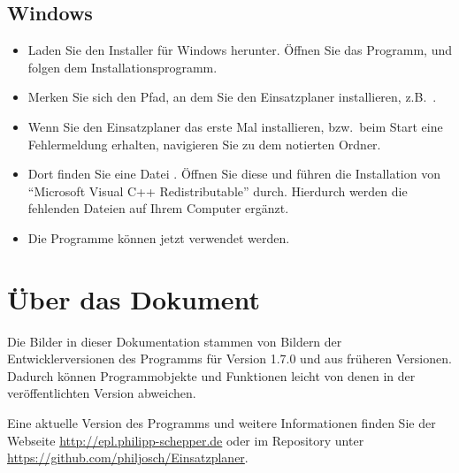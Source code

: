 \subsection{Windows}
\begin{itemize}
  \item Laden Sie den Installer für Windows herunter.
  Öffnen Sie das Programm, und folgen dem Installationsprogramm.
  \item Merken Sie sich den Pfad, an dem Sie den Einsatzplaner installieren, z.B.\ .
  \item Wenn Sie den Einsatzplaner das erste Mal installieren,
  bzw.\ beim Start eine Fehlermeldung erhalten,
  navigieren Sie zu dem notierten Ordner.
  \item Dort finden Sie eine Datei .
  Öffnen Sie diese und führen die Installation von \enquote{Microsoft Visual C++ Redistributable} durch.
  Hierdurch werden die fehlenden Dateien auf Ihrem Computer ergänzt.
  \item Die Programme können jetzt verwendet werden.
\end{itemize}



\section{Über das Dokument}\label{epl:allg:sonstiges}
Die Bilder in dieser Dokumentation stammen von Bildern der Entwicklerversionen des Programms für Version
1.7.0
und aus früheren Versionen.
Dadurch können Programmobjekte und Funktionen leicht von denen in der veröffentlichten Version abweichen.

Eine aktuelle Version des Programms und weitere Informationen finden Sie der Webseite \url{http://epl.philipp-schepper.de}
oder im Repository unter \url{https://github.com/philjosch/Einsatzplaner}.
